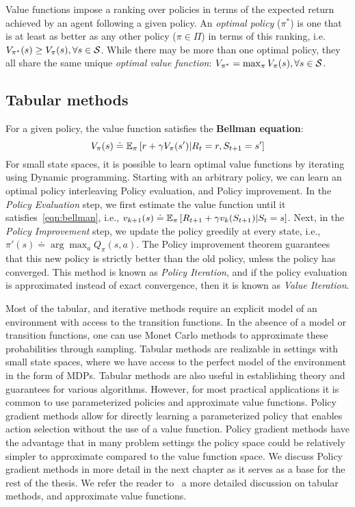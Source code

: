 Value functions impose a ranking over policies in terms of the expected return achieved by an agent
following a given policy.
An \textit{optimal policy} ($\pi^\ast$) is one that is at least as better as any other policy ($\pi
	\in \Pi$) in terms of this ranking, i.e. $V_{\pi^\ast}(s) \geq V_\pi(s), \forall s \in \mathcal{S}$.
While there may be more than one optimal policy, they all share the same unique \textit{optimal
	value function}: $V_{\pi^{\ast}} = \max_{\pi} V_\pi(s), \forall s \in \mathcal{S}$.

\subsection{Tabular methods}
For a given policy, the value function satisfies the \textbf{Bellman equation}:
\begin{equation}
	\label{eqn:bellman} V_\pi(s) \doteq \mathbb{E}_\pi \left[r + \gamma V_\pi(s') | R_t = r, S_{t+1} = s'
		\right]
\end{equation} For small state spaces, it is possible to learn optimal value functions by
iterating using Dynamic programming.
Starting with an arbitrary policy, we can learn an optimal policy interleaving Policy evaluation,
and Policy improvement.
In the \textit{Policy Evaluation} step, we first estimate the value function until it
satisfies~\ref{eqn:bellman}, i.e., $v_{k+1}(s) \doteq \mathbb{E}_\pi \left[R_{t+1} + \gamma v_k(S_{t+1})
		|S_t =s\right]$.
Next, in the \textit{Policy Improvement} step, we update the policy greedily at every state, i.e.,
$\pi'(s) \doteq \arg \max_{a} Q_\pi(s,a)$.
The Policy improvement theorem guarantees that this new policy is strictly better than the old
policy, unless the policy has converged.
This method is known as \textit{Policy Iteration}, and if the policy evaluation is approximated
instead of exact convergence, then it is known as \textit{Value Iteration}.

Most of the tabular, and iterative methods require an explicit model of an environment with access
to the transition functions.
In the absence of a model or transition functions, one can use Monet Carlo methods to approximate
these probabilities through sampling.
Tabular methods are realizable in settings with small state spaces, where we have access to the
perfect model of the environment in the form of MDPs.
Tabular methods are also useful in establishing theory and guarantees for various algorithms.
However, for most practical applications it is common to use parameterized policies and approximate
value functions.
Policy gradient methods allow for directly learning a parameterized policy that enables action
selection without the use of a value function.
Policy gradient methods have the advantage that in many problem settings the policy space could be
relatively simpler to approximate compared to the value function space.
We discuss Policy gradient methods in more detail in the next chapter as it serves as a base for
the rest of the thesis.
We refer the reader to~\cite{suttonReinforcement2018} a more detailed discussion on tabular
methods, and approximate value functions.


